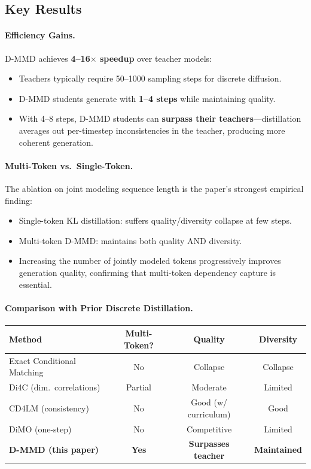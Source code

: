 \documentclass[11pt]{article}
\begin{document}
\subsection{Key Results}

\paragraph{Efficiency Gains.}
D-MMD achieves \textbf{4--16$\times$ speedup} over teacher models:
\begin{itemize}
    \item Teachers typically require 50--1000 sampling steps for discrete diffusion.
    \item D-MMD students generate with \textbf{1--4 steps} while maintaining quality.
    \item With 4--8 steps, D-MMD students can \textbf{surpass their teachers}---distillation averages out per-timestep inconsistencies in the teacher, producing more coherent generation.
\end{itemize}

\paragraph{Multi-Token vs.\ Single-Token.}
The ablation on joint modeling sequence length is the paper's strongest empirical finding:
\begin{itemize}
    \item Single-token KL distillation: suffers quality/diversity collapse at few steps.
    \item Multi-token D-MMD: maintains both quality AND diversity.
    \item Increasing the number of jointly modeled tokens progressively improves generation quality, confirming that multi-token dependency capture is essential.
\end{itemize}

\paragraph{Comparison with Prior Discrete Distillation.}

\begin{center}
\begin{tabular}{lccc}
\toprule
\textbf{Method} & \textbf{Multi-Token?} & \textbf{Quality} & \textbf{Diversity} \\
\midrule
Exact Conditional Matching & No & Collapse & Collapse \\
Di4C (dim.\ correlations) & Partial & Moderate & Limited \\
CD4LM (consistency) & No & Good (w/ curriculum) & Good \\
DiMO (one-step) & No & Competitive & Limited \\
\textbf{D-MMD (this paper)} & \textbf{Yes} & \textbf{Surpasses teacher} & \textbf{Maintained} \\
\bottomrule
\end{tabular}
\end{center}
\end{document}
